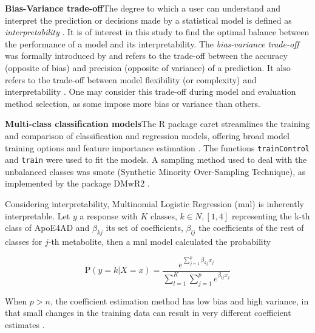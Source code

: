 \documentclass{amsart}
\begin{document}
\leavevmode\newline \textbf{Bias-Variance trade-off}\hspace{.25cm}The degree to which a user can understand and interpret the prediction or decisions made by a statistical model is defined as \textit{interpretability} \cite{Elshawi2019OnHypertension}. It is of interest in this study to find the optimal balance between the performance of a model and its interpretability. The \textit{bias-variance trade-off} was formally introduced by \citeauthor{Geman1992NeuralDilemma} and refers to the trade-off between the accuracy (opposite of bias) and precision (opposite of variance) of a prediction. It also refers to the trade-off between model flexibility (or complexity) and interpretability \cite{Geman1992NeuralDilemma}. One may consider this trade-off during model and evaluation method selection, as some impose more bias or variance than others.

\leavevmode\newline \textbf{Multi-class classification models}\hspace{.25cm}The R package \textsf{caret} streamlines the training and comparison of classification and regression models, offering broad model training options and feature importance estimation \cite{Kuhn2008BuildingPackage}. The functions \texttt{trainControl} and \texttt{train} were used to fit the models. A sampling method used to deal with the unbalanced classes was \acrshort{smote} (Synthetic Minority Over-Sampling Technique), as implemented by the package \textsf{DMwR2} \cite{DMwR2}.

Considering interpretability, Multinomial Logistic Regression (\acrshort{mnl}) is inherently interpretable. Let $y$ a response with $K$ classes, $k \in N, [1,4]$ representing the k-th class of ApoE4AD and $\beta_{kj}$ its set of coefficients,  $\beta_{lj}$ the coefficients of the rest of classes for $j$-th metabolite, then a \acrlong{mnl} model calculated the probability

\[\textrm{P}(y=k|X=x) =  \dfrac{e^{\sum_{j=1}^{p}\beta_{kj}x_j}}{\sum_{l=1}^{K}\sum_{j=1}^{p}e^{\beta_{lj}x_j}}\]

When $p > n$, the coefficient estimation method has low bias and high variance, in that small changes in the training data can result in very different coefficient estimates \cite{James2023AnEdition}. 
\end{document}
